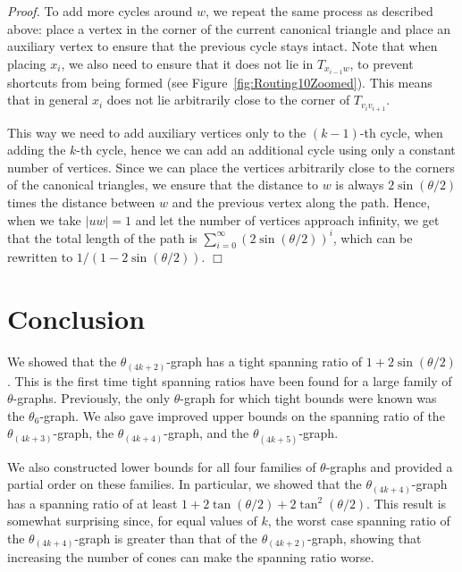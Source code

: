\documentclass[12pt]{article}
\newenvironment{proof}{\emph{Proof.}}{\hfill $\Box$\\}
\newcommand{\graph}[1]{\ensuremath{\theta_{(4 k + #1)}}-graph\xspace}
\newcommand{\canon}[2]{\ensuremath{T_{#1 #2}}}
\begin{document}
\begin{proof}
  To add more cycles around $w$, we repeat the same process as described above: place a vertex in the corner of the current canonical triangle and place an auxiliary vertex to ensure that the previous cycle stays intact. Note that when placing $x_i$, we also need to ensure that it does not lie in \canon{x_{i-1}}{w}, to prevent shortcuts from being formed (see Figure~\ref{fig:Routing10Zoomed}). This means that in general $x_i$ does not lie arbitrarily close to the corner of \canon{v_i}{v_{i+1}}. 

  This way we need to add auxiliary vertices only to the $(k-1)$-th cycle, when adding the $k$-th cycle, hence we can add an additional cycle using only a constant number of vertices. Since we can place the vertices arbitrarily close to the corners of the canonical triangles, we ensure that the distance to $w$ is always $2 \sin (\theta/2)$ times the distance between $w$ and the previous vertex along the path. Hence, when we take $|u w| = 1$ and let the number of vertices approach infinity, we get that the total length of the path is $\sum_{i=0}^\infty \left(2 \sin (\theta/2) \right)^i$, which can be rewritten to $1 / \left(1 - 2 \sin (\theta/2) \right)$.
\end{proof}


\section{Conclusion}
We showed that the \graph{2} has a tight spanning ratio of $1 + 2 \sin(\theta/2)$. This is the first time tight spanning ratios have been found for a large family of $\theta$-graphs. Previously, the only $\theta$-graph for which tight bounds were known was the $\theta_6$-graph. We also gave improved upper bounds on the spanning ratio of the \graph{3}, the \graph{4}, and the \graph{5}. 

We also constructed lower bounds for all four families of $\theta$-graphs and provided a partial order on these families. In particular, we showed that the \graph{4} has a spanning ratio of at least $1 + 2 \tan(\theta/2) + 2 \tan^2(\theta/2)$. This result is somewhat surprising since, for equal values of $k$, the worst case spanning ratio of the \graph{4} is greater than that of the \graph{2}, showing that increasing the number of cones can make the spanning ratio worse. 
\end{document}
